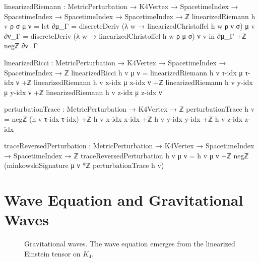 \documentclass[11pt,a4paper]{book}
\begin{document}
\begin{code}
linearizedRiemann : MetricPerturbation → K4Vertex → 
                    SpacetimeIndex → SpacetimeIndex → 
                    SpacetimeIndex → SpacetimeIndex → ℤ
linearizedRiemann h v ρ σ μ ν = 
  let ∂μ_Γ = discreteDeriv (λ w → linearizedChristoffel h w ρ ν σ) μ v
      ∂ν_Γ = discreteDeriv (λ w → linearizedChristoffel h w ρ μ σ) ν v
  in ∂μ_Γ +ℤ negℤ ∂ν_Γ

linearizedRicci : MetricPerturbation → K4Vertex → 
                  SpacetimeIndex → SpacetimeIndex → ℤ
linearizedRicci h v μ ν = 
  linearizedRiemann h v τ-idx μ τ-idx ν +ℤ
  linearizedRiemann h v x-idx μ x-idx ν +ℤ
  linearizedRiemann h v y-idx μ y-idx ν +ℤ
  linearizedRiemann h v z-idx μ z-idx ν

perturbationTrace : MetricPerturbation → K4Vertex → ℤ
perturbationTrace h v = 
  negℤ (h v τ-idx τ-idx) +ℤ
  h v x-idx x-idx +ℤ
  h v y-idx y-idx +ℤ
  h v z-idx z-idx

traceReversedPerturbation : MetricPerturbation → K4Vertex → 
                            SpacetimeIndex → SpacetimeIndex → ℤ
traceReversedPerturbation h v μ ν = 
  h v μ ν +ℤ negℤ (minkowskiSignature μ ν *ℤ perturbationTrace h v)
\end{code}

\section{Wave Equation and Gravitational Waves}

\begin{figure}[h]
\centering
{}
\caption{Gravitational waves. The wave equation emerges from the linearized Einstein tensor on $K_4$.}
\label{fig:gravitational-waves}
\end{figure}
\end{document}
